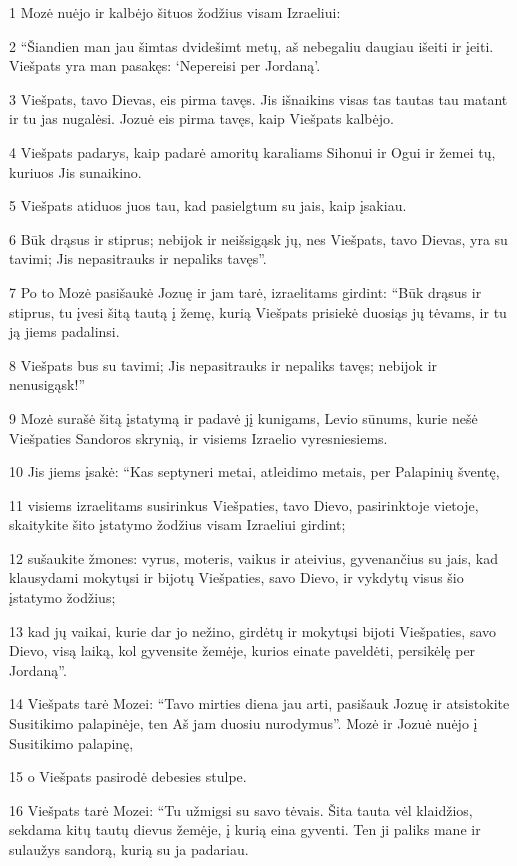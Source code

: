 \par 1 Mozė nuėjo ir kalbėjo šituos žodžius visam Izraeliui: 
\par 2 “Šiandien man jau šimtas dvidešimt metų, aš nebegaliu daugiau išeiti ir įeiti. Viešpats yra man pasakęs: ‘Nepereisi per Jordaną’. 
\par 3 Viešpats, tavo Dievas, eis pirma tavęs. Jis išnaikins visas tas tautas tau matant ir tu jas nugalėsi. Jozuė eis pirma tavęs, kaip Viešpats kalbėjo. 
\par 4 Viešpats padarys, kaip padarė amoritų karaliams Sihonui ir Ogui ir žemei tų, kuriuos Jis sunaikino. 
\par 5 Viešpats atiduos juos tau, kad pasielgtum su jais, kaip įsakiau. 
\par 6 Būk drąsus ir stiprus; nebijok ir neišsigąsk jų, nes Viešpats, tavo Dievas, yra su tavimi; Jis nepasitrauks ir nepaliks tavęs”. 
\par 7 Po to Mozė pasišaukė Jozuę ir jam tarė, izraelitams girdint: “Būk drąsus ir stiprus, tu įvesi šitą tautą į žemę, kurią Viešpats prisiekė duosiąs jų tėvams, ir tu ją jiems padalinsi. 
\par 8 Viešpats bus su tavimi; Jis nepasitrauks ir nepaliks tavęs; nebijok ir nenusigąsk!” 
\par 9 Mozė surašė šitą įstatymą ir padavė jį kunigams, Levio sūnums, kurie nešė Viešpaties Sandoros skrynią, ir visiems Izraelio vyresniesiems. 
\par 10 Jis jiems įsakė: “Kas septyneri metai, atleidimo metais, per Palapinių šventę, 
\par 11 visiems izraelitams susirinkus Viešpaties, tavo Dievo, pasirinktoje vietoje, skaitykite šito įstatymo žodžius visam Izraeliui girdint; 
\par 12 sušaukite žmones: vyrus, moteris, vaikus ir ateivius, gyvenančius su jais, kad klausydami mokytųsi ir bijotų Viešpaties, savo Dievo, ir vykdytų visus šio įstatymo žodžius; 
\par 13 kad jų vaikai, kurie dar jo nežino, girdėtų ir mokytųsi bijoti Viešpaties, savo Dievo, visą laiką, kol gyvensite žemėje, kurios einate paveldėti, persikėlę per Jordaną”. 
\par 14 Viešpats tarė Mozei: “Tavo mirties diena jau arti, pasišauk Jozuę ir atsistokite Susitikimo palapinėje, ten Aš jam duosiu nurodymus”. Mozė ir Jozuė nuėjo į Susitikimo palapinę, 
\par 15 o Viešpats pasirodė debesies stulpe. 
\par 16 Viešpats tarė Mozei: “Tu užmigsi su savo tėvais. Šita tauta vėl klaidžios, sekdama kitų tautų dievus žemėje, į kurią eina gyventi. Ten ji paliks mane ir sulaužys sandorą, kurią su ja padariau. 
